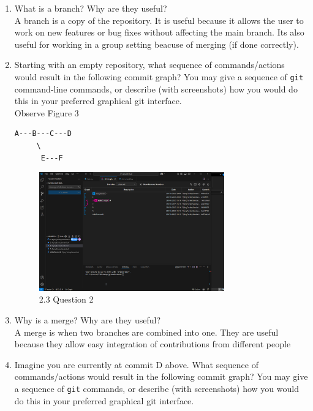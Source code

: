 \documentclass[10pt,twocolumn]{article}
\begin{document}
\begin{enumerate}
\item What is a branch? Why are they useful?\\

A branch is a copy of the repository. It is useful because it allows the user to work on new features or bug fixes without affecting the main branch. Its also useful for working in a group setting beacuse of merging (if done correctly).\\


\item Starting with an empty repository, what sequence of commands/actions would result in the following commit graph? You may give a sequence of \texttt{git} command-line commands, or describe (with screenshots) how you would do this in your preferred graphical git interface.\\

Observe Figure 3

\begin{verbatim}
A---B---C---D
     \
      E---F
\end{verbatim}

\begin{figure}[htp]
    \centering
    \includegraphics[width=8cm]{Q2.png}
    \caption{2.3 Question 2}
\end{figure}\textbf{}


\item Why is a merge? Why are they useful?\\

A merge is when two branches are combined into one. They are useful because they allow easy integration of contributions from different people\\

\item Imagine you are currently at commit D above. What sequence of commands/actions would result in the following commit graph? You may give a sequence of \texttt{git} commands, or describe (with screenshots) how you would do this in your preferred graphical git interface.\\


\end{enumerate}
\end{document}
